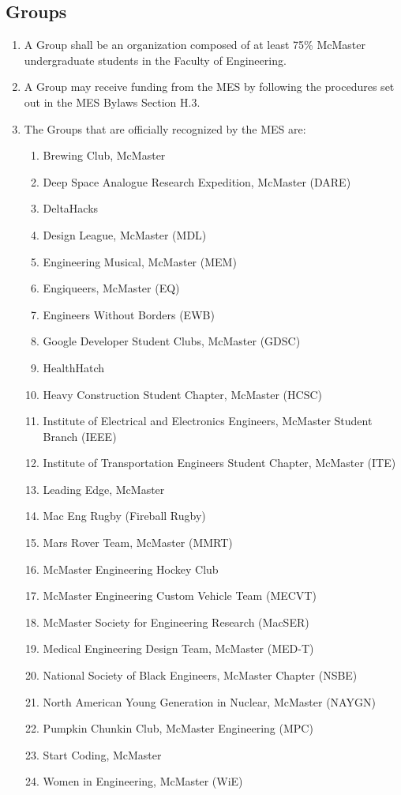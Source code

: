 \hypertarget{groups}{%
 \subsection{Groups}
 \label{groups}}
\begin{enumerate}
 \item
  A Group shall be an organization composed of at least 75\% McMaster
  undergraduate students in the Faculty of Engineering.
 \item
  A Group may receive funding from the MES by following the procedures
  set out in the MES Bylaws Section H.3.
 \item
  The Groups that are officially recognized by the MES are:

  \begin{enumerate}
   \item
    Brewing Club, McMaster
   \item
    Deep Space Analogue Research Expedition, McMaster (DARE)
   \item
    DeltaHacks
   \item
    Design League, McMaster (MDL)
   \item
    Engineering Musical, McMaster (MEM)
   \item
    Engiqueers, McMaster (EQ)
   \item
    Engineers Without Borders (EWB)
   \item
    Google Developer Student Clubs, McMaster (GDSC)
   \item
    HealthHatch
   \item
    Heavy Construction Student Chapter, McMaster (HCSC)
   \item
    Institute of Electrical and Electronics Engineers, McMaster Student
    Branch (IEEE)
   \item
    Institute of Transportation Engineers Student Chapter, McMaster
    (ITE)
   \item
    Leading Edge, McMaster
   \item
    Mac Eng Rugby (Fireball Rugby)
   \item
    Mars Rover Team, McMaster (MMRT)
   \item
    McMaster Engineering Hockey Club
   \item
    McMaster Engineering Custom Vehicle Team (MECVT)
   \item
    McMaster Society for Engineering Research (MacSER)
   \item
    Medical Engineering Design Team, McMaster (MED-T)
   \item
    National Society of Black Engineers, McMaster Chapter (NSBE)
   \item
    North American Young Generation in Nuclear, McMaster (NAYGN)
   \item
    Pumpkin Chunkin Club, McMaster Engineering (MPC)
   \item
    Start Coding, McMaster
   \item
    Women in Engineering, McMaster (WiE)
  \end{enumerate}
\end{enumerate}

